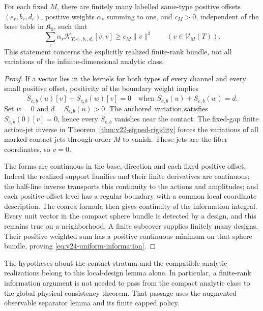 \begin{lemma}
\label{lem:v24-uniform-positive-design}
For each fixed \(M\), there are finitely many labelled same-type positive
offsets \((e_r,b_r,d_r)\), positive weights \(\alpha_r\) summing to one,
and \(c_M>0\), independent of the base table in \(\mathfrak K_0\), such
that
\begin{equation}\label{eq:v24-uniform-information}
 \sum_r\alpha_r\mathcal K_{T,e_r,b_r,d_r}[v,v]
                                  \ge c_M\|v\|^2
 \qquad(v\in\mathcal V_M(T)).
\end{equation}
This statement concerns the explicitly realized finite-rank bundle, not all
variations of the infinite-dimensional analytic class.
\end{lemma}

\begin{proof}
If a vector lies in the kernels for both types of every channel and every
small positive offset, positivity of the boundary weight implies
\[
                  \dot S_{e,b}(u)[v]+\dot S_{e,b}(w)[v]=0
 \quad\text{when }S_{e,b}(u)+S_{e,b}(w)=d.
\]
Set \(w=0\) and \(d=S_{e,b}(u)>0\).  The anchored variation satisfies
\(\dot S_{e,b}(0)[v]=0\), hence every \(\dot S_{e,b}\) vanishes near the
contact.  The fixed-gap finite action-jet inverse in
Theorem~\ref{thm:v22-signed-rigidity} forces the variations of all marked
contact jets through order \(M\) to vanish.  These jets are the fiber
coordinates, so \(v=0\).

The forms are continuous in the base, direction and each fixed positive
offset.  Indeed the realized support families and their finite derivatives
are continuous; the half-line inverse transports this continuity to the
actions and amplitudes; and each positive-offset level has a regular
boundary with a common local coordinate description.  The coarea formula
then gives continuity of the information integral.  Every unit vector in
the compact sphere bundle is detected by a design, and this remains true on
a neighborhood.  A finite subcover supplies finitely many designs.  Their
positive weighted sum has a positive continuous minimum on that sphere
bundle, proving \eqref{eq:v24-uniform-information}.
\end{proof}

The hypotheses about the contact stratum and the compatible analytic
realizations belong to this local-design lemma alone.  In particular, a
finite-rank information argument is not needed to pass from the compact
analytic class to the global physical consistency theorem.  That passage
uses the augmented observable separator lemma and its finite capped policy.

